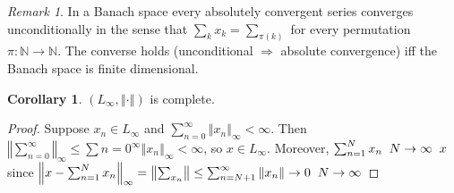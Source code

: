 \documentclass[10pt,a4paper]{article}
\theoremstyle{definition}
\theoremstyle{cor}
\newtheorem{cor}{Corollary}
\theoremstyle{theorem}
\theoremstyle{lemma}
\theoremstyle{example}
\theoremstyle{remark}
\newtheorem{remark}{Remark}
\newcommand{\norm}[1]{\left\Vert #1 \right\Vert}
\begin{document}
\begin{remark}
In a Banach space every absolutely convergent series converges unconditionally in the sense that $\sum_{k} x_k = \sum_{\pi(k)}$ for every permutation $\pi : \mathbb{N} \to \mathbb{N}$. The converse holds (unconditional $\Rightarrow$ absolute convergence) iff the Banach space is finite dimensional. 
\end{remark}

\begin{cor}
$\left(L_{\infty}, \norm{\cdot}\right)$ is complete.
\end{cor}
\begin{proof}
Suppose $x_n\in L_{\infty}$ and $\sum_{n=0}^{\infty}\norm{x_n}_{\infty} < \infty$. Then $\norm{\sum_{n=0}^{\infty}}_{\infty} \leq \sum{n=0}^{\infty} \norm{x_n}_{\infty} < \infty$, so $x\in L_{\infty}$. Moreover, $\sum_{n =1}^{N}x_n \hspace{2mm} N\to\infty \hspace{2mm} x$ since $\norm{x - \sum_{n=1}^{N} x_n}_{\infty} = \norm{\sum_{x_n}} \leq \sum_{n = N+1}^{\infty} \norm{x_n} \to 0 \hspace{2mm} N\to\infty$ 
\end{proof}
\end{document}
